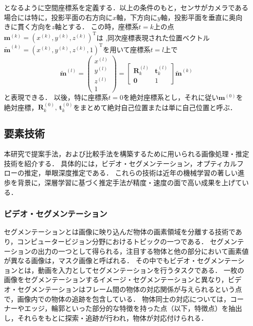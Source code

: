 となるように空間座標系を定義する．以上の条件のもと，センサがカメラである場合には特に，投影平面の右方向に$x$軸，下方向に$y$軸，投影平面を垂直に奥向きに貫く方向を$z$軸とする．
この時，座標系$t=k$上の点
$\mathbf{m}^{(k)}={(x^{(k)} , y^{(k)}, z^{(k)})}^\mathrm{T}$は
,同次座標表現された位置ベクトル$\tilde{\mathbf{m}}^{(k)}={(x^{(k)} , y^{(k)}, z^{(k)},1)}^\mathrm{T}$を用いて座標系$t=l$上で
\begin{equation}\label{eq:trans}
	\tilde{\mathbf{m}}^{(l)}
	=
	\left(\begin{array}{c}
		x^{(l)}\\ y^{(l)}\\ z^{(l)} \\ 1
	\end{array}
	\right)
	=
	\left[\begin{array}{cc}
		\mathbf{R}^{(l)}_k & \mathbf{t}^{(l)}_k \\ \mathbf{0} & 1
	\end{array}
	\right]
	\tilde{\mathbf{m}}^{(k)}
\end{equation}
と表現できる．
以後，特に座標系$t=0$を絶対座標系とし，それに従い$\mathbf{m}^{(0)}$を絶対座標，$\mathbf{R}^{(0)}_k,\, \mathbf{t}^{(0)}_k$をまとめて絶対自己位置または単に自己位置と呼ぶ．
\par

\subsection{要素技術}\label{subsec:techniques}

本研究で提案手法，および比較手法を構築するために用いられる画像処理・推定技術を紹介する．
具体的には，ビデオ・セグメンテーション，オプティカルフローの推定，単眼深度推定である．
これらの技術は近年の機械学習の著しい進歩を背景に，深層学習に基づく推定手法が精度・速度の面で高い成果を上げている．

\subsubsection{ビデオ・セグメンテーション}\label{subsec:video_segmentation}

セグメンテーションとは画像に映り込んだ物体の画素領域を分離する技術であり，コンピュータービジョン分野におけるトピックの一つである．
セグメンテーションの出力の一つとして得られる，注目する物体と他の部分において画素値が異なる画像は，マスク画像と呼ばれる．
その中でもビデオ・セグメンテーションとは，動画を入力としてセグメンテーションを行うタスクである．
一枚の画像をセグメンテーションするイメージ・セグメンテーションと異なり，ビデオ・セグメンテーションはフレーム間の物体の対応関係が与えられるという点で，画像内での物体の追跡を包含している．
物体同士の対応については，コーナーやエッジ，輪郭といった部分的な特徴を持った点（以下，特徴点）を抽出し，それらをもとに探索・追跡が行われ，物体が対応付けられる．


